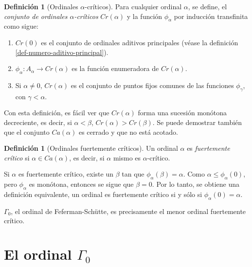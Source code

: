 \documentclass[11pt,a4paper]{book}
\theoremstyle{plain}
\theoremstyle{definition}
\newtheorem{definicion}[teorema]{Definición}
\theoremstyle{remark}
\begin{document}
\begin{definicion}[Ordinales $\alpha$-críticos]
\label{def-alfa-críticos}
  Para cualquier ordinal $\alpha$, se define, el \textit{conjunto de ordinales $\alpha$-críticos} $Cr(\alpha)$ y la función $\phi_\alpha$ por inducción transfinita como sigue:
  \begin{enumerate}
    \item $Cr(0)$ es el conjunto de ordinales aditivos principales (véase la definición \ref{def-numero-aditivo-principal}).
    \item $\phi_\alpha: A_\alpha \rightarrow Cr(\alpha)$ es la función enumeradora de $Cr(\alpha)$.
    \item Si $\alpha \neq 0$, $Cr(\alpha)$ es el conjunto de puntos fijos comunes de las funciones $\phi_\gamma$, con $\gamma < \alpha$. 
    
  \end{enumerate}
\end{definicion}

Con esta definición, es fácil ver que $Cr(\alpha)$ forma una sucesión monótona decreciente, es decir, si $\alpha < \beta$, $Cr(\alpha) > Cr(\beta)$. Se puede demostrar también que el conjunto $Ca(\alpha)$ es cerrado y que no está acotado.

\begin{definicion}[Ordinales fuertemente críticos]
  \label{def-fuerte-criticos}
  Un ordinal $\alpha$ es \textit{fuertemente crítico} si $\alpha \in Ca(\alpha)$, es decir, si $\alpha$ mismo es $\alpha$-crítico. 
\end{definicion}

Si $\alpha$ es fuertemente crítico, existe un $\beta$ tan que $\phi_\alpha (\beta) = \alpha$. Como $\alpha \leq \phi_\alpha (0)$, pero $\phi_\alpha$ es monótona, entonces se sigue que $\beta = 0$. Por lo tanto, se obtiene una definición equivalente, un ordinal es fuertemente crítico si y sólo si $\phi_\alpha (0) = \alpha$. 

$\Gamma_0$, el ordinal de Feferman-Schütte, es precisamente el menor ordinal fuertemente crítico.

\section{El ordinal \texorpdfstring{$\Gamma_0$}{Gamma0}}


\printbibliography
\end{document}
